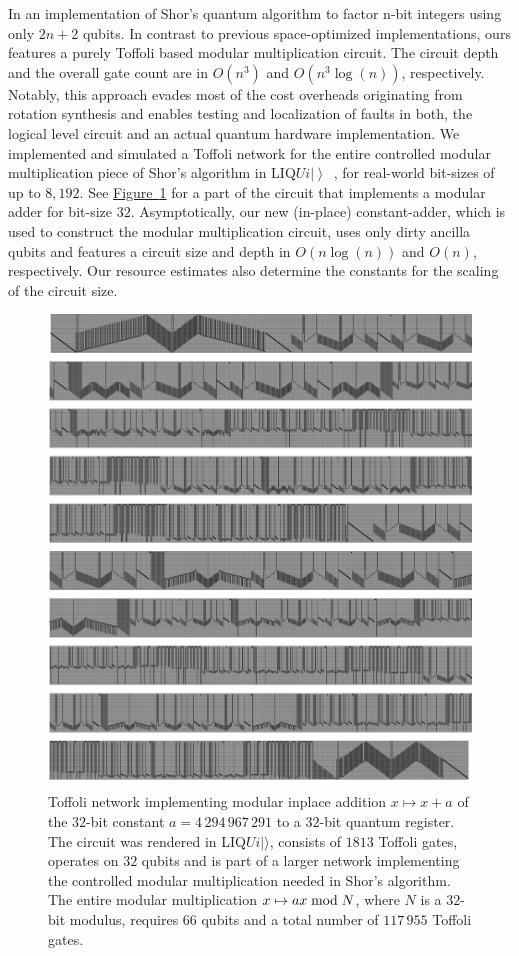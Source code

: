 \documentclass[conference]{IEEEtran}
\newcommand{\fig}[1]{\hyperref[fig:#1]{Figure~\ref*{fig:#1}}}
\newcommand{\ket}[1]{\left| #1\right\rangle}        %
\newcommand{\Liquid}{LIQ$Ui\ket{}$\ }
\begin{document}
In \cite{HRS16} an implementation of Shor's quantum algorithm to factor n-bit integers using only $2n+2$ qubits. In contrast to previous space-optimized implementations, ours features a purely Toffoli based modular multiplication circuit. The circuit depth and the overall gate count are in $O(n^3)$ and $O(n^3 \log(n))$, respectively. Notably, this approach evades most of the cost overheads originating from rotation synthesis and enables testing and localization of faults in both, the logical level circuit and an actual quantum hardware implementation. We implemented and simulated a Toffoli network for the entire controlled modular multiplication piece of Shor's algorithm in \Liquid, for real-world bit-sizes of up to $8,1 92$. See \fig{adder} for a part of the circuit that implements a modular adder for bit-size $32$. Asymptotically, our new (in-place) constant-adder, which is used to construct the modular multiplication circuit, uses only dirty ancilla qubits and features a circuit size and depth in $O(n \log(n))$ and $O(n)$, respectively. Our resource estimates also determine  the constants for the scaling of the circuit size. 

\begin{figure}[hbt]
\centering
\includegraphics[width=0.9\columnwidth]{pictures/adder.pdf}
\caption{\label{fig:adder} Toffoli network \cite{HRS16} implementing modular inplace addition $x \mapsto x+a$ of the $32$-bit constant $a=4\,294\,967\,291$ to a $32$-bit quantum register. The circuit was rendered in LIQ$Ui|\rangle$, consists of $1813$ Toffoli gates, operates on $32$ qubits and is part of a larger network implementing the controlled modular multiplication needed in Shor's algorithm. The entire modular multiplication $x \mapsto ax\;{\rm mod}\;N$, where $N$ is a $32$-bit modulus, requires $66$ qubits and a total number of $117\,955$ Toffoli gates.}
\end{figure}
\end{document}

